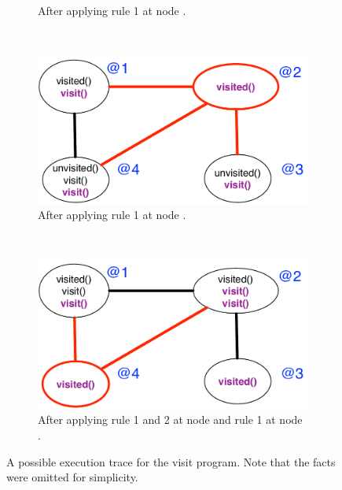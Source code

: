\begin{figure}[h]
\begin{subfigure}[b]{0.45\textwidth}
                \caption{After applying rule 1 at node .}
                \label{fig:exec_trace2}
        \end{subfigure}\\
        \begin{subfigure}[b]{0.45\textwidth}
                \includegraphics[width=\textwidth]{figures/visit/trace3}
                \caption{After applying rule 1 at node .}
                \label{fig:exec_trace3}
        \end{subfigure}%
        ~ %
        \begin{subfigure}[b]{0.45\textwidth}
                  \includegraphics[width=\textwidth]{figures/visit/trace4}

                  \caption{After applying rule 1 and 2 at node  and
                  rule 1 at node .}

                  \label{fig:exec_trace4}
          \end{subfigure}
        \caption{A possible execution trace for the visit
           program. Note that the  facts were omitted for simplicity.}
        \label{fig:exec_trace}
\end{figure}

